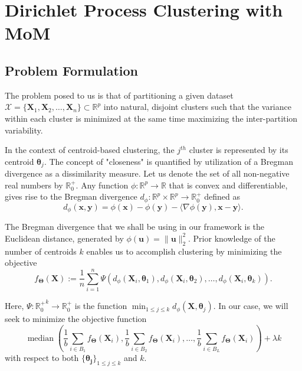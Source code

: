 \documentclass[11pt]{article}
\newcommand{\bX}{\boldsymbol{X}}
\begin{document}
\section{Dirichlet Process Clustering with MoM}

\subsection{Problem Formulation}
The problem posed to us is that of partitioning a given dataset $\mathcal{X} = \{\bX_1, \bX_2, \ldots, \bX_n\}\subset \mathbb{R}^p$ into natural, disjoint clusters such that the variance within each cluster is minimized at the same time maximizing the inter-partition variability. 


In the context of centroid-based clustering, the $j^{th}$ cluster is represented by its centroid $\boldsymbol{\theta}_j$. The concept of "closeness" is quantified by utilization of a Bregman divergence \citep{BREGMAN1967200} as a dissimilarity measure. Let us denote the set of all non-negative real numbers by $\mathbb{R}^{+}_0$. Any function $\phi: \mathbb{R}^p \rightarrow \mathbb{R}$ that is convex and differentiable, gives rise to the Bregman divergence $d_\phi: \mathbb{R}^p \times \mathbb{R}^p \rightarrow \mathbb{R}^{+}_0$ defined as
\begin{equation}
    d_\phi(\boldsymbol{x}, \boldsymbol{y})=\phi(\boldsymbol{x})-\phi(\boldsymbol{y})-\langle\nabla \phi(\boldsymbol{y}), \boldsymbol{x}-\boldsymbol{y}\rangle.
\end{equation}

The Bregman divergence that we shall be using in our framework is the Euclidean distance, generated by $\phi(\boldsymbol{u})=\|\boldsymbol{u}\|_2^2$. Prior knowledge of the number of centroids $k$ enables us to accomplish clustering by minimizing the objective
\begin{equation}\label{ob}
    f_{\boldsymbol{\Theta}}(\boldsymbol{X}) := \frac{1}{n} \sum_{i=1}^n \Psi\left(d_\phi\left(\boldsymbol{X}_i, \boldsymbol{\theta}_1\right), d_\phi\left(\boldsymbol{X}_i, \boldsymbol{\theta}_2\right), \ldots, d_\phi\left(\boldsymbol{X}_i, \boldsymbol{\theta}_k\right)\right).
\end{equation}

Here, $\Psi: {\mathbb{R}^{+}_0}^k \rightarrow \mathbb{R}^{+}_0$ is the function $\min_{1\le j\le k} d_{\phi}(\bm{X},\bm{\theta}_j)$. In our case, we will seek to minimize the objective function
\begin{equation}\label{obj}
    \operatorname{median}\left(\frac{1}{b} \sum_{i \in B_1} f_{\boldsymbol{\Theta}}\left(\boldsymbol{X}_i\right), \frac{1}{b} \sum_{i \in B_2} f_{\boldsymbol{\Theta}}\left(\boldsymbol{X}_i\right), \ldots, \frac{1}{b} \sum_{i \in B_L} f_{\boldsymbol{\Theta}}\left(\boldsymbol{X}_i\right)\right) + \lambda k
\end{equation}
with respect to both $\{\bm{\theta_j}\}_{1\le j\le k}$ and $k$.
\end{document}
